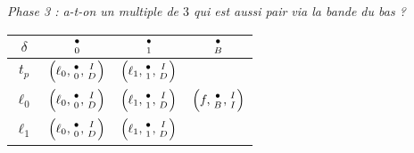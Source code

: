 \begin{center}
	\emph{\small Phase 3 : a-t-on un multiple de $3$ qui est aussi pair via la bande du bas ?}
	
	\smallskip
	\renewcommand{\arraystretch}{1.25}
	\begin{tabular}{|c||c|c|c||}
		\hline
		$\delta$ 
			& $\twocoord{\bullet}{0}$ 
			& $\twocoord{\bullet}{1}$ 
			& $\twocoord{\bullet}{B}$  \\
		\hline
		\hline
		$t_p$
			& $\left( \ell_0 , \twocoord{\bullet}{0} , \twocoord{I}{D} \right)$
			& $\left( \ell_1 , \twocoord{\bullet}{1} , \twocoord{I}{D} \right)$
			&                                                                   \\
		\hline
		\hline
		$\ell_0$
			& $\left( \ell_0 , \twocoord{\bullet}{0} , \twocoord{I}{D} \right)$
			& $\left( \ell_1 , \twocoord{\bullet}{1} , \twocoord{I}{D} \right)$
			& $\left( f      , \twocoord{\bullet}{B} , \twocoord{I}{I} \right)$ \\
		\hline
		$\ell_1$
			& $\left( \ell_0 , \twocoord{\bullet}{0} , \twocoord{I}{D} \right)$
			& $\left( \ell_1 , \twocoord{\bullet}{1} , \twocoord{I}{D} \right)$
			&                                                                   \\
		\hline
	\end{tabular}
	\renewcommand{\arraystretch}{1}
\end{center}